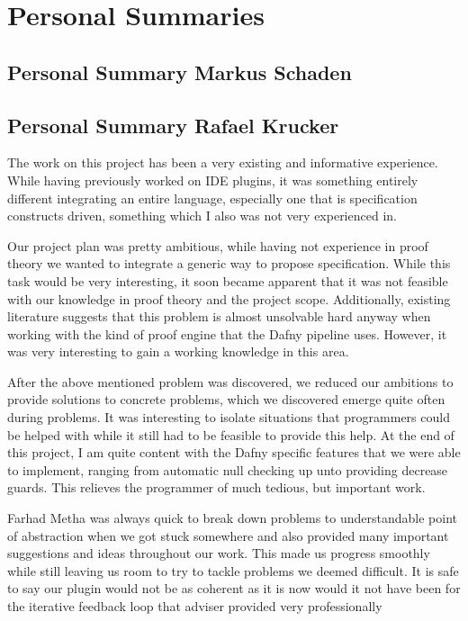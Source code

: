 \section{Personal Summaries}

\subsection{Personal Summary Markus Schaden}

\subsection{Personal Summary Rafael Krucker}
The work on this project has been a very existing and informative experience. While having previously worked on IDE plugins, it was something entirely different integrating an entire language, especially one that is specification constructs driven, something which I also was not very experienced in. \newline

Our project plan was pretty ambitious, while having not experience in proof theory we wanted to integrate a generic way to propose specification. While this task would be very interesting, it soon became apparent that it was not feasible with our knowledge in proof theory and the project scope. Additionally, existing literature suggests that this problem is almost unsolvable hard anyway when working with the kind of proof engine that the Dafny pipeline uses. However, it was very interesting to gain a working knowledge in this area. \newline

After the above mentioned problem was discovered, we reduced our ambitions to provide solutions to concrete problems, which we discovered emerge quite often during problems. It was interesting to isolate situations that programmers could be helped with while it still had to be feasible to provide this help. At the end of this project, I am quite content with the Dafny specific features that we were able to implement, ranging from automatic null checking up unto providing decrease guards. This relieves the programmer of much tedious, but important work. \newline

Farhad Metha was always quick to break down problems to understandable point of abstraction when we got stuck somewhere and also provided many important suggestions and ideas throughout our work. This made us progress smoothly while still leaving us room to try to tackle problems we deemed difficult. It is safe to say our plugin would not be as coherent as it is now would it not have been for the iterative feedback loop that adviser provided very professionally \newline

